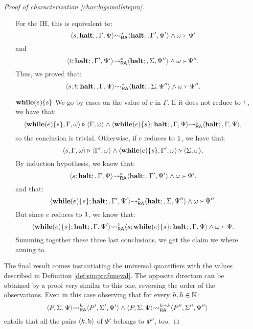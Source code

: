 \begin{proof}[Proof of characterization \ref{char:bigsmallstepra}]
\begin{itemize}
    For the IH, this is equivalent to:
    $$
    \langle s;\mathbf{halt};, \Gamma, \Psi\rangle {\leadsto_{\mathsf{RA}}^{*}} \langle \mathbf{halt};, \Gamma', \Psi'\rangle \land \omega\Yright \Psi'
    $$
    and
    $$
    \langle t;\mathbf{halt};, \Gamma', \Psi'\rangle {\leadsto_{\mathsf{RA}}^{*}} \langle \mathbf{halt};, \Sigma, \Psi''\rangle \land \omega\Yright \Psi''.
    $$
    Thus, we proved that:
    $$
    \langle s;t;\mathbf{halt};, \Gamma, \Psi\rangle {\leadsto_{\mathsf{RA}}^{*}} \langle \mathbf{halt};, \Sigma, \Psi''\rangle \land \omega\Yright \Psi''.
    $$
    \item[$\mathbf{while}(e)\{s\}$] We go by cases on the value of $e$ in $\Gamma$. If it does
    not reduce to $\mathtt{1}$, we have that:
    $$
    \begin{gathered}
      \langle \mathbf{while}(e)\{s\}, \Gamma, \omega\rangle \triangleright \langle \Gamma, \omega\rangle \land
      \langle \mathbf{while}(e)\{s\};\mathbf{halt};, \Gamma, \Psi\rangle {\leadsto_{\mathsf{RA}}^{1}} \langle \mathbf{halt};, \Gamma, \Psi\rangle,
    \end{gathered}
    $$
    so the conclusion is trivial.
    Otherwise, if $e$ reduces to $\mathtt{1}$, we have that:
    $$
    \langle s, \Gamma, \omega\rangle \triangleright \langle \Gamma', \omega\rangle
    \land
    \langle \mathbf{while}(e)\{s\}, \Gamma', \omega\rangle \triangleright \langle \Sigma, \omega\rangle.
    $$
    By induction hypothesis, we know that:
    $$
    \langle s;\mathbf{halt};, \Gamma, \Psi\rangle {\leadsto_{\mathsf{RA}}^{*}} \langle \mathbf{halt};, \Gamma', \Psi'\rangle \land \omega \Yright \Psi',
    $$
    and that:
    $$
    \langle \mathbf{while}(e)\{s\};\mathbf{halt};, \Gamma', \Psi'\rangle {\leadsto_{\mathsf{RA}}^{*}} \langle \mathbf{halt};, \Sigma, \Psi''\rangle \land \omega \Yright \Psi''.
    $$
    But since $e$ reduces to $\mathtt{1}$, we know that:
    $$
      \langle \mathbf{while}(e)\{s\};\mathbf{halt};, \Gamma, \Psi'\rangle {\leadsto_{\mathsf{RA}}^{1}} \langle s;\mathbf{while}(e)\{s\};\mathbf{halt};, \Gamma, \Psi\rangle \land \omega \Yright \Psi.
    $$
    Summing together these three last conclusions, we get the claim we where aiming to.
  \end{itemize}
  The final result comes instantiating the universal quantifiers with
  the values described in Definition \ref{def:simprafuneval}.
  The opposite direction can be obtained by a proof very similar to this one,
  reversing the order of the observations. Even in this case observing that
  for every $h, h \in \mathbb{N}$:
  $$
  \langle P, \Sigma, \Psi\rangle {\leadsto_{\mathsf{RA}}^{h}} \langle P', \Sigma', \Psi'\rangle \land
  \langle P, \Sigma, \Psi\rangle {\leadsto_{\mathsf{RA}}^{h+k}} \langle P'', \Sigma'', \Psi''\rangle
  $$
  entails that all the pairs $\langle k, \mathtt{b}\rangle$ of $\Psi'$ belongs to $\Psi''$, too.
  \end{proof}

